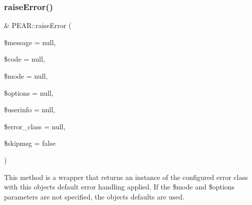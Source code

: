\subsubsection{\texorpdfstring{raise\+Error()}{raiseError()}}
{\footnotesize\ttfamily \& P\+E\+A\+R\+::raise\+Error (\begin{DoxyParamCaption}\item[{}]{\$message = {\ttfamily null},  }\item[{}]{\$code = {\ttfamily null},  }\item[{}]{\$mode = {\ttfamily null},  }\item[{}]{\$options = {\ttfamily null},  }\item[{}]{\$userinfo = {\ttfamily null},  }\item[{}]{\$error\+\_\+class = {\ttfamily null},  }\item[{}]{\$skipmsg = {\ttfamily false} }\end{DoxyParamCaption})}

This method is a wrapper that returns an instance of the configured error class with this object\textquotesingle{}s default error handling applied. If the \$mode and \$options parameters are not specified, the object\textquotesingle{}s defaults are used.


